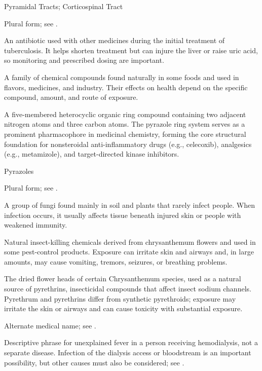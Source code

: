 \synonyms
Pyramidal Tracts; Corticospinal Tract

 Plural form; see .

 An antibiotic used with other medicines during the initial treatment of tuberculosis. It helps shorten treatment but can injure the liver or raise uric acid, so monitoring and prescribed dosing are important.

 A family of chemical compounds found naturally in some foods and used in flavors, medicines, and industry. Their effects on health depend on the specific compound, amount, and route of exposure.

 A five-membered heterocyclic organic ring compound containing two adjacent nitrogen atoms and three carbon atoms. The pyrazole ring system serves as a prominent pharmacophore in medicinal chemistry, forming the core structural foundation for nonsteroidal anti-inflammatory drugs (e.g., celecoxib), analgesics (e.g., metamizole), and target-directed kinase inhibitors.

\synonyms
Pyrazoles

 Plural form; see .

 A group of fungi found mainly in soil and plants that rarely infect people. When infection occurs, it usually affects tissue beneath injured skin or people with weakened immunity.

 Natural insect-killing chemicals derived from chrysanthemum flowers and used in some pest-control products. Exposure can irritate skin and airways and, in large amounts, may cause vomiting, tremors, seizures, or breathing problems.

 The dried flower heads of certain Chrysanthemum species, used as a natural source of pyrethrins, insecticidal compounds that affect insect sodium channels. Pyrethrum and pyrethrins differ from synthetic pyrethroids; exposure may irritate the skin or airways and can cause toxicity with substantial exposure.

 Alternate medical name; see .

 Descriptive phrase for unexplained fever in a person receiving hemodialysis, not a separate disease. Infection of the dialysis access or bloodstream is an important possibility, but other causes must also be considered; see .


